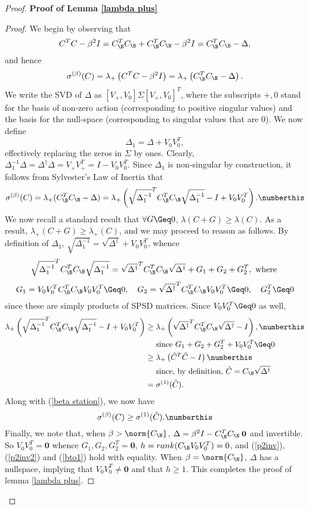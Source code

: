 \begin{proof}
\noindent \textbf{Proof of Lemma \ref{lambda plus}}
\begin{proof}
We begin by observing that
\[ C^T C - \beta^2 I  = C_{\B} ^T C_{\B} + C_{\N} ^T C_{\N} - \beta^2 I = C_{\B} ^T C_{\B}  - \Delta, \]
and hence
\[ \sigma^{(\beta)} (C) = \lambda_+ \left( C^T C - \beta^2 I \right) = \lambda_+ \left( C_{\B} ^T C_{\B}  - \Delta \right). \]
We write the SVD of $\Delta$ as $[V_+, V_0] \Sigma [V_+, V_0]^T$, where the subscripts $+, 0$ stand for the basis of non-zero action (corresponding to positive singular values) and the basis for the null-space (corresponding to singular values that are 0). We now define 
\[ \Delta_1 = \Delta + V_0 V_0 ^T, \]
effectively replacing the zeros in $\Sigma$ by ones. Clearly, $\Delta_1 ^{-1} \Delta = \Delta^{\dagger} \Delta = V_+ V_+ ^T = I - V_0 V_0 ^T$. Since $\Delta_1$ is non-singular by construction, it follows from Sylvester's Law of Inertia that
\[ \sigma^{(\beta)} (C) = \lambda_+ (C_{\B} ^T C_{\B}  - \Delta) = \lambda_+ \left( \sqrt{\Delta_1 ^{-1}} ^T C_{\B} ^T C_{\B} \sqrt{\Delta_1 ^{-1}} -  I + V_0 V_0 ^T  \right) . \numberthis \label{beta station} \]
We now recall a standard result that $\forall G \Geq 0$, $\lambda(C + G) \geq \lambda(C)$. As a result, $\lambda_+ (C+G) \geq \lambda_+ (C)$, and we may proceed to reason as follows. By definition of $\Delta_1$, $\sqrt{\Delta_1^{-1}} = \sqrt{\Delta^{\dagger}} + V_0 V_0 ^T$, whence 
\[ \sqrt{ \Delta_1 ^{-1} } ^T C_{\B} ^T C_{\B} \sqrt{ \Delta_1 ^{-1}}  = \sqrt{\Delta^{\dagger}}^T C_{\B} ^T C_{\B} \sqrt{\Delta^{\dagger}} + G_1 + G_2 + G_2 ^T, \text{ where } \]
\[ G_1 = V_0 V_0 ^T C_{\B} ^T C_{\B} V_0 V_0 ^T \Geq 0, \quad  G_2 = \sqrt{\Delta^{\dagger}}^T C_{\B} ^T C_{\B} V_0 V_0 ^T \Geq 0, \quad  G_2 ^T \Geq 0 \] 
since these are simply products of SPSD matrices. Since $V_0 V_0 ^T \Geq 0$ as well, 
\begin{align*}
\lambda_+ \left( \sqrt{ \Delta_1 ^{-1} } ^T C_{\B} ^T C_{\B} \sqrt{ \Delta_1 ^{-1} } - I + V_0 V_0 ^T \right)  & \geq \lambda_+ \left( \sqrt{\Delta^{\dagger}}^T C_{\B} ^T C_{\B} \sqrt{\Delta^{\dagger}}  - I \right),  \numberthis \label{p2inv}\\ 
& \quad \text{ since } G_1 + G_2 + G_2 ^T + V_0 V_0 ^T \Geq 0 \\
& \geq \lambda_+ \left( \tilde{C} ^T \tilde{C} - I \right) \numberthis \label{p2inv2} \\
& \quad \text{ since, by definition, } \tilde{C} = C_{\B} \sqrt{\Delta ^{\dagger}} \\
& = \sigma^{(1)}(\tilde C).
\end{align*}
Along with (\ref{beta station}), we now have
\[ \sigma^{(\beta)}(C) \geq \sigma^{(1)}(\tilde C). \numberthis \label{bto1} \]
Finally, we note that, when $\beta > \norm{C_{\N}}$, $\Delta = \beta ^2 I - C_{\N}^T C_{\N}  \> \mathbf{0}$ and invertible. So $V_0 V_0 ^T = \mathbf{0}$ whence $G_1, G_2, G_2^T = \mathbf{0}$, $h = rank(C_{\B} V_0 V_0 ^T) = 0$, and (\ref{p2inv}), (\ref{p2inv2}) and (\ref{bto1}) hold with equality. When $\beta = \norm{C_{\N}}$, $\Delta$ has a nullspace, implying that $V_0 V_0 ^T \neq \mathbf{0}$ and that $h \geq 1$. This completes the proof of lemma \ref{lambda plus}.
\end{proof}


\end{proof}
